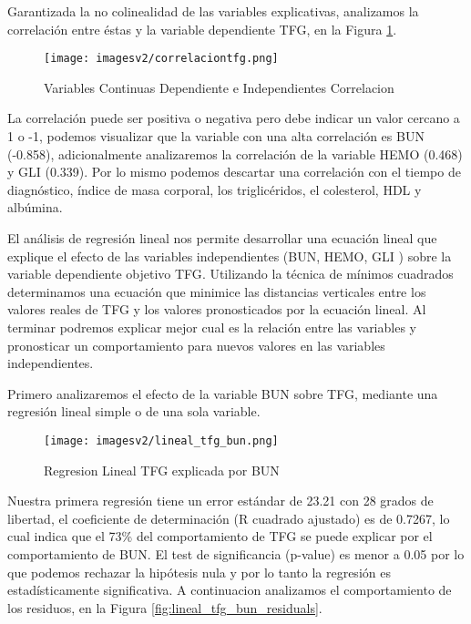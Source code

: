 \documentclass[runningheads,a4paper]{llncs}
\begin{document}

Garantizada la no colinealidad de las variables explicativas, analizamos la correlación entre  éstas y la variable dependiente \ac{TFG}, en la Figura \ref{fig:dependiente_correlacion}.


\begin{figure}[!ht]
\centering
\texttt{[image: imagesv2/correlaciontfg.png]}
\caption{Variables Continuas Dependiente e Independientes Correlacion}
\label{fig:dependiente_correlacion}
\end{figure}

La correlación puede ser positiva o negativa pero debe indicar un valor cercano a 1 o -1, podemos visualizar que la variable con una alta correlación es \ac{BUN} (-0.858), adicionalmente analizaremos la correlación de la variable \ac{HEMO} (0.468) y \ac{GLI}  (0.339). Por lo mismo podemos descartar una correlación con el tiempo de diagnóstico, índice de masa corporal, los triglicéridos, el colesterol, HDL y albúmina.

El análisis de regresión lineal nos permite desarrollar una ecuación lineal que explique el efecto de las variables independientes (\ac{BUN}, \ac{HEMO}, \ac{GLI} ) sobre la variable dependiente objetivo \ac{TFG}. Utilizando la técnica de mínimos cuadrados determinamos una ecuación que minimice las distancias verticales entre los valores reales de TFG y los valores pronosticados por la ecuación lineal. Al terminar podremos explicar mejor cual es la relación entre las variables y pronosticar un comportamiento para nuevos valores en las variables independientes.

Primero analizaremos el efecto de la variable BUN sobre \ac{TFG}, mediante una regresión lineal simple o de una sola variable.

\begin{figure}[!ht]
\centering
\texttt{[image: imagesv2/lineal\_tfg\_bun.png]}
\caption{Regresion Lineal TFG explicada por BUN}
\label{fig:lineal_tfg_bun}
\end{figure}

Nuestra primera regresión tiene un error estándar de 23.21 con 28 grados de libertad, el coeficiente de determinación (R cuadrado ajustado) es de 0.7267, lo cual indica que el 73\% del comportamiento de TFG se puede explicar por el comportamiento de BUN. El test de significancia (p-value) es menor a 0.05 por lo que podemos rechazar la hipótesis nula y por lo tanto la regresión es estadísticamente significativa. A continuacion analizamos el comportamiento de los residuos, en la Figura \ref{fig:lineal_tfg_bun_residuals}. 
\end{document}
